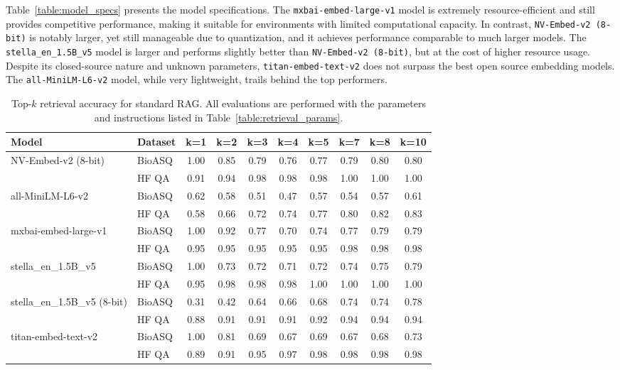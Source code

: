 \documentclass[pdflatex,sn-mathphys-num]{sn-jnl}%
\theoremstyle{thmstyleone}%
\theoremstyle{thmstyletwo}%
\theoremstyle{thmstylethree}%
\begin{document}
Table~\ref{table:model_specs} presents the model specifications. The \texttt{mxbai-embed-large-v1} model is extremely resource-efficient and still provides competitive performance, making it suitable for environments with limited computational capacity. In contrast, \texttt{NV-Embed-v2 (8-bit)} is notably larger, yet still manageable due to quantization, and it achieves performance comparable to much larger models. The \texttt{stella\_en\_1.5B\_v5} model is larger and performs slightly better than \texttt{NV-Embed-v2 (8-bit)}, but at the cost of higher resource usage. Despite its closed-source nature and unknown parameters, \texttt{titan-embed-text-v2} does not surpass the best open source embedding models. The \texttt{all-MiniLM-L6-v2} model, while very lightweight, trails behind the top performers.

\begin{table}[h]
\centering
\small
\begin{tabular}{l l c c c c c c c c}
\hline
\textbf{Model} & \textbf{Dataset} & \textbf{k=1} & \textbf{k=2} & \textbf{k=3} & \textbf{k=4} & \textbf{k=5} & \textbf{k=7} & \textbf{k=8} & \textbf{k=10} \\
\hline
\multirow{2}{*}{NV-Embed-v2 (8-bit)} 
 & BioASQ & 1.00 & 0.85 & 0.79 & 0.76 & 0.77 & 0.79 & 0.80 & 0.80 \\
 & HF QA  & 0.91 & 0.94 & 0.98 & 0.98 & 0.98 & 1.00 & 1.00 & 1.00 \\
\hline
\multirow{2}{*}{all-MiniLM-L6-v2} 
 & BioASQ & 0.62 & 0.58 & 0.51 & 0.47 & 0.57 & 0.54 & 0.57 & 0.61 \\
 & HF QA  & 0.58 & 0.66 & 0.72 & 0.74 & 0.77 & 0.80 & 0.82 & 0.83 \\
\hline
\multirow{2}{*}{mxbai-embed-large-v1} 
 & BioASQ & 1.00 & 0.92 & 0.77 & 0.70 & 0.74 & 0.77 & 0.79 & 0.79 \\
 & HF QA  & 0.95 & 0.95 & 0.95 & 0.95 & 0.95 & 0.98 & 0.98 & 0.98 \\
\hline
\multirow{2}{*}{stella\_en\_1.5B\_v5} 
 & BioASQ & 1.00 & 0.73 & 0.72 & 0.71 & 0.72 & 0.74 & 0.75 & 0.79 \\
 & HF QA  & 0.95 & 0.98 & 0.98 & 0.98 & 1.00 & 1.00 & 1.00 & 1.00 \\
\hline
\multirow{2}{*}{stella\_en\_1.5B\_v5 (8-bit)} 
 & BioASQ & 0.31 & 0.42 & 0.64 & 0.66 & 0.68 & 0.74 & 0.74 & 0.78 \\
 & HF QA  & 0.88 & 0.91 & 0.91 & 0.91 & 0.92 & 0.94 & 0.94 & 0.94 \\
\hline
\multirow{2}{*}{titan-embed-text-v2} 
 & BioASQ & 1.00 & 0.81 & 0.69 & 0.67 & 0.69 & 0.67 & 0.68 & 0.73 \\
 & HF QA  & 0.89 & 0.91 & 0.95 & 0.97 & 0.98 & 0.98 & 0.98 & 0.98 \\
\hline
\end{tabular}
\caption{Top-$k$ retrieval accuracy for standard RAG. All evaluations are performed with the parameters and instructions listed in Table~\ref{table:retrieval_params}.}
\label{table:standard_rag_results}
\end{table}
\end{document}
